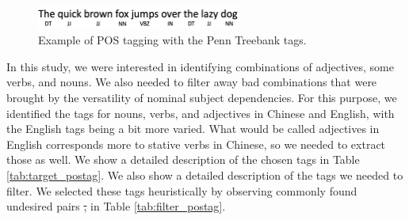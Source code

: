 \documentclass[smallextended,natbib]{svjour3}       %
\providecommand{\DIFdel}[1]{{\protect\color{red}\sout{#1}}}                      %
\providecommand{\DIFdelbegin}{} %
\providecommand{\DIFdelend}{} %
\newcommand{\DIFscaledelfig}{0.5}
\newlength{\DIFdelgraphicswidth} %
\newlength{\DIFdelgraphicsheight} %
\newcommand{\DIFdelincludegraphics}[2][]{%
\sbox{\DIFdelgraphicsbox}{\DIFOincludegraphics[#1]{#2}}%
\settoboxwidth{\DIFdelgraphicswidth}{\DIFdelgraphicsbox} %
\settoboxtotalheight{\DIFdelgraphicsheight}{\DIFdelgraphicsbox} %
\scalebox{\DIFscaledelfig}{%
\parbox[b]{\DIFdelgraphicswidth}{\usebox{\DIFdelgraphicsbox}\\[-\baselineskip] \rule{\DIFdelgraphicswidth}{0em}}\llap{\resizebox{\DIFdelgraphicswidth}{\DIFdelgraphicsheight}{%
\setlength{\unitlength}{\DIFdelgraphicswidth}%
\begin{picture}(1,1)%
\thicklines\linethickness{2pt} %
{\color[rgb]{1,0,0}\put(0,0){\framebox(1,1){}}}%
{\color[rgb]{1,0,0}\put(0,0){\line( 1,1){1}}}%
{\color[rgb]{1,0,0}\put(0,1){\line(1,-1){1}}}%
\end{picture}%
}\hspace*{3pt}}} %
} %
\DeclareRobustCommand{\DIFdelbegin}{\DIFOdelbegin \let\includegraphics\DIFdelincludegraphics} %
\DeclareRobustCommand{\DIFdelend}{\DIFOaddend \let\includegraphics\DIFOincludegraphics} %
\begin{document}
    \begin{figure}[ht]
    \centering
    \includegraphics[width=0.6\textwidth]{postag.png}
    \caption{Example of POS tagging with the Penn Treebank tags.}
    \label{fig:postag}
    \end{figure}

    In this study, we were interested in identifying combinations of adjectives, some verbs, and nouns. We also needed to filter away bad combinations that were brought by the versatility of nominal subject dependencies. For this purpose, we identified the tags for nouns, verbs, and adjectives in Chinese and English, with the English tags being a bit more varied. What would be called adjectives in English corresponds more to stative verbs in Chinese, so we needed to extract those as well. We show a detailed description of the chosen tags in Table \ref{tab:target_postag}. We also show a detailed description of the tags we needed to filter. We selected these tags heuristically by observing commonly found undesired pairs \DIFdelbegin \DIFdel{, }\DIFdelend in Table \ref{tab:filter_postag}.
\end{document}
